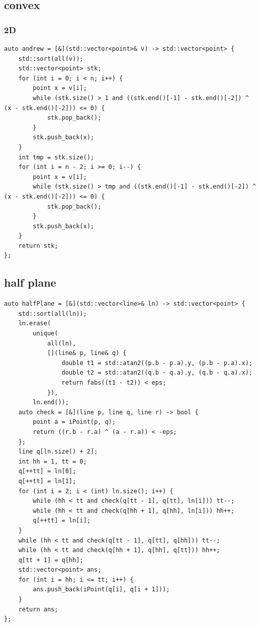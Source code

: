 \documentclass[UTF8, a4paper, titlepage, twoside]{ctexart}
\begin{document}
\subsection{ convex }
\subsubsection*{ 2D }
\begin{lstlisting}[style=cpp]
auto andrew = [&](std::vector<point>& v) -> std::vector<point> {
    std::sort(all(v));
    std::vector<point> stk;
    for (int i = 0; i < n; i++) {
        point x = v[i];
        while (stk.size() > 1 and ((stk.end()[-1] - stk.end()[-2]) ^ (x - stk.end()[-2])) <= 0) {
            stk.pop_back();
        }
        stk.push_back(x);
    }
    int tmp = stk.size();
    for (int i = n - 2; i >= 0; i--) {
        point x = v[i];
        while (stk.size() > tmp and ((stk.end()[-1] - stk.end()[-2]) ^ (x - stk.end()[-2])) <= 0) {
            stk.pop_back();
        }
        stk.push_back(x);
    }
    return stk;
};
\end{lstlisting}

\subsection*{ half plane }
\begin{lstlisting}[style=cpp]
auto halfPlane = [&](std::vector<line>& ln) -> std::vector<point> {
    std::sort(all(ln));
    ln.erase(
        unique(
            all(ln),
            [](line& p, line& q) {
                double t1 = std::atan2((p.b - p.a).y, (p.b - p.a).x);
                double t2 = std::atan2((q.b - q.a).y, (q.b - q.a).x);
                return fabs((t1 - t2)) < eps;
            }),
        ln.end());
    auto check = [&](line p, line q, line r) -> bool {
        point a = iPoint(p, q);
        return ((r.b - r.a) ^ (a - r.a)) < -eps;
    };
    line q[ln.size() + 2];
    int hh = 1, tt = 0;
    q[++tt] = ln[0];
    q[++tt] = ln[1];
    for (int i = 2; i < (int) ln.size(); i++) {
        while (hh < tt and check(q[tt - 1], q[tt], ln[i])) tt--;
        while (hh < tt and check(q[hh + 1], q[hh], ln[i])) hh++;
        q[++tt] = ln[i];
    }
    while (hh < tt and check(q[tt - 1], q[tt], q[hh])) tt--;
    while (hh < tt and check(q[hh + 1], q[hh], q[tt])) hh++;
    q[tt + 1] = q[hh];
    std::vector<point> ans;
    for (int i = hh; i <= tt; i++) {
        ans.push_back(iPoint(q[i], q[i + 1]));
    }
    return ans;
};
\end{lstlisting}
\end{document}
